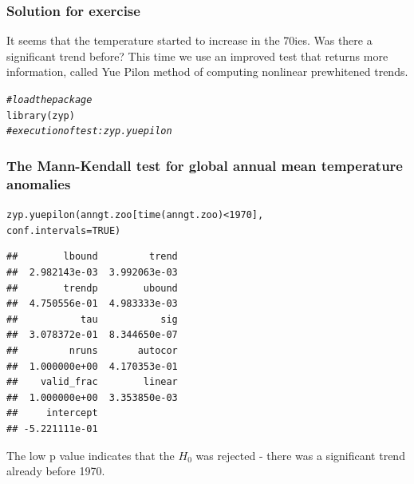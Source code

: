 \documentclass[xcolor=table, xcolor=dvipsnames]{beamer}\usepackage[]{graphicx}\usepackage[]{color}
\makeatletter
\newcommand{\hlnum}[1]{\textcolor[rgb]{0,0,0}{#1}}
\newcommand{\hlcom}[1]{\textcolor[rgb]{0,0.392,0}{\textit{#1}}}
\newcommand{\hlopt}[1]{\textcolor[rgb]{0,0,0}{#1}}
\newcommand{\hlstd}[1]{\textcolor[rgb]{0,0,0}{#1}}
\newcommand{\hlkwc}[1]{\textcolor[rgb]{1,0,1}{#1}}
\newcommand{\hlkwd}[1]{\textcolor[rgb]{0,0,1}{#1}}
\newenvironment{kframe}{%
 \def\at@end@of@kframe{}%
 \ifinner\ifhmode%
  \def\at@end@of@kframe{\end{minipage}}%
  \begin{minipage}{\columnwidth}%
 \fi\fi%
 \def\FrameCommand##1{\hskip\@totalleftmargin \hskip-\fboxsep
 \colorbox{shadecolor}{##1}\hskip-\fboxsep
     \hskip-\linewidth \hskip-\@totalleftmargin \hskip\columnwidth}%
 \MakeFramed {\advance\hsize-\width
   \@totalleftmargin\z@ \linewidth\hsize
   \@setminipage}}%
 {\par\unskip\endMakeFramed%
 \at@end@of@kframe}
\newenvironment{knitrout}{}{} %
\newcounter{exercisecount}
\makeatother
\begin{document}

\begin{frame}[fragile]\frametitle{Solution for exercise }
It seems that the temperature started to increase in the 70ies. Was there a significant trend before? This time we use an improved test that returns more information, called Yue Pilon method of computing nonlinear prewhitened trends.
\begin{knitrout}
\color{fgcolor}\begin{kframe}
\begin{alltt}
\hlcom{# load the package}
\hlkwd{library}\hlstd{(zyp)}
\hlcom{# execution of test: zyp.yuepilon}
\end{alltt}
\end{kframe}
\end{knitrout}
\end{frame}

\begin{frame}[fragile]\frametitle{The Mann-Kendall test for global annual mean temperature anomalies}
\begin{knitrout}\footnotesize
{}\color{fgcolor}\begin{kframe}
\begin{alltt}
\hlkwd{zyp.yuepilon}\hlstd{(anngt.zoo[}\hlkwd{time}\hlstd{(anngt.zoo)} \hlopt{<} \hlnum{1970}\hlstd{],}
             \hlkwc{conf.intervals}\hlstd{=}\hlnum{TRUE}\hlstd{)}
\end{alltt}
\begin{verbatim}
##        lbound         trend 
##  2.982143e-03  3.992063e-03 
##        trendp        ubound 
##  4.750556e-01  4.983333e-03 
##           tau           sig 
##  3.078372e-01  8.344650e-07 
##         nruns       autocor 
##  1.000000e+00  4.170353e-01 
##    valid_frac        linear 
##  1.000000e+00  3.353850e-03 
##     intercept 
## -5.221111e-01
\end{verbatim}
\end{kframe}
\end{knitrout}
The low p value indicates that the $H_0$ was rejected - there was a significant trend already before 1970.
\end{frame}

\end{document}
